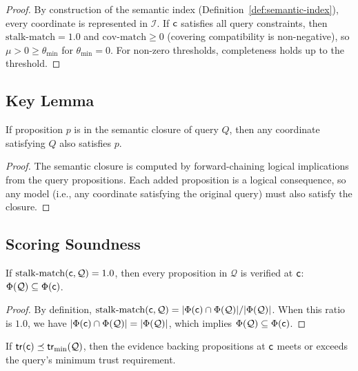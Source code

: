 \documentclass[11pt]{article}
\newcommand{\SemIndex}{\mathcal{I}}
\newcommand{\QuerySheaf}{\mathcal{Q}}
\newcommand{\MatchScore}{\mu}
\newcommand{\CoverMatch}{\mathrm{cov\text{-}match}}
\newcommand{\StalknMatch}{\mathrm{stalk\text{-}match}}
\newcommand{\props}{\Phi}                           %
\newcommand{\tr}{\mathsf{tr}}                        %
\begin{document}
\begin{proof}
By construction of the semantic index
(Definition~\ref{def:semantic-index}), every coordinate is represented
in $\SemIndex$.  If $\mathsf{c}$ satisfies all query constraints, then
$\StalknMatch = 1.0$ and $\CoverMatch \geq 0$ (covering compatibility
is non-negative), so $\MatchScore > 0 \geq \theta_{\min}$ for
$\theta_{\min} = 0$.  For non-zero thresholds, completeness holds
up to the threshold.
\end{proof}

\subsection{Key Lemma}

\begin{lemma}\label{lem:closure-entail}
If proposition $p$ is in the semantic closure of query $Q$, then any
coordinate satisfying $Q$ also satisfies $p$.
\end{lemma}

\begin{proof}
The semantic closure is computed by forward-chaining logical
implications from the query propositions.  Each added proposition is
a logical consequence, so any model (i.e., any coordinate satisfying
the original query) must also satisfy the closure.
\end{proof}

\subsection{Scoring Soundness}

\begin{lemma}\label{lem:stalk-entails}
If $\StalknMatch(\coord, \QuerySheaf) = 1.0$, then every proposition
in $\QuerySheaf$ is verified at $\mathsf{c}$: $\props(\QuerySheaf) \subseteq
\props(\coord)$.
\end{lemma}

\begin{proof}
By definition, $\StalknMatch(\coord, \QuerySheaf) =
|\props(\coord) \cap \props(\QuerySheaf)| / |\props(\QuerySheaf)|$.
When this ratio is $1.0$, we have
$|\props(\coord) \cap \props(\QuerySheaf)| = |\props(\QuerySheaf)|$,
which implies $\props(\QuerySheaf) \subseteq \props(\coord)$.
\end{proof}

\begin{lemma}\label{lem:trust-compat}
If $\tr(\coord) \tleq \tr_{\min}(\QuerySheaf)$, then the evidence
backing propositions at $\mathsf{c}$ meets or exceeds the query's
minimum trust requirement.
\end{lemma}
\end{document}

